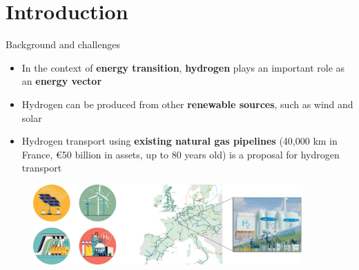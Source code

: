 \documentclass[9pt]{beamer}
\author[Daniella LOPES PINTO]{Daniella LOPES PINTO \textsuperscript{1,2*} \\ 
\texttt{\textcolor{black}{daniella.lopes\_pinto@minesparis.psl.eu}}}
\subtitle{\LARGE Finite element models for the study of hydrogen embrittlement of steel structures}
\institute
{\textbf{Academic advisor}: Jacques BESSON \textsuperscript{1} \\
\vspace{0.25cm}
\textbf{Industrial advisors}: Nikolay OSIPOV \textsuperscript{2} \\
\vspace{0.4cm}
{\textsuperscript{1} Centre des Matériaux, Mines Paris} \\
\vspace{0.15cm}
\textsuperscript{2} Transvalor S.A. \\
\vspace{0.2cm}
\center{\textbf{Thesis defense} \\ \small March 7\textsuperscript{th} 2025} 
\center{\textcolor{white}{XXXXXXXX}}}
\begin{document}
\begin{frame}[plain]
    \maketitle
\end{frame}

\section{Introduction}


\begin{frame}{Background and challenges}

    \begin{itemize}
		\item In the context of \textbf{energy transition}, \textbf{hydrogen} plays an important role as an \textbf{energy vector}
		\vspace{0.15cm}
		\item Hydrogen can be produced from other \textbf{renewable sources}, such as wind and solar
		\vspace{0.15cm}
		\item Hydrogen transport using \textbf{existing natural gas pipelines} (40,000 km in France, €50 billion in assets, up to 80 years old) is a proposal for hydrogen transport
    \end{itemize}
    
    \vspace{0.2cm}

\begin{figure}
	\centering
	\includegraphics[width=0.92\textwidth]{Images/Context.pdf}
\end{figure}
    
\end{frame}

\end{document}
